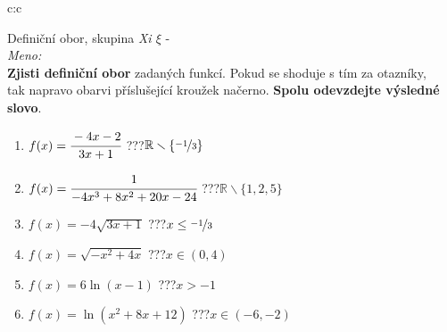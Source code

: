 \documentclass[10pt]{report}
\begin{document}
\newpage
\thispagestyle{empty}
\begin{tabular}{c:c}
\begin{minipage}[c][99mm][t]{0.49\linewidth}
\begin{center}
\vspace{7mm}
{\huge Definiční obor, skupina \textit{Xi $\xi$} -}\\[4.5mm]
\textit{Meno:}\phantom{xxxxxxxxxxxxxxxxxxxxxxxxxxxxxxxxxxxxxxxxxxxxxxxxxxxxxxxxxxxxxxxxx}\\[3.5mm]
\textbf{Zjisti definiční obor} zadaných funkcí. Pokud se shoduje s tím za otazníky,\\tak napravo obarvi příslušející kroužek načerno. \textbf{Spolu odevzdejte výsledné slovo}.\\[3mm]
\begin{minipage}{0.77\linewidth}
\begin{center}
\begin{varwidth}{\textwidth}
\begin{enumerate}
\normalsize
\item $f(x)=\cfrac{-4x-2}{3x+1}$\quad \dotfill\; ???\;\dotfill \quad $\mathbb{R}\smallsetminus\{\nicefrac{-1}{3}\}$
\item $f(x)=\cfrac{1}{-4x^3+8x^2+20x-24}$\quad \dotfill\; ???\;\dotfill \quad $\mathbb{R}\smallsetminus\{1,2,5\}$
\item $f(x)=-4\sqrt{3x+1}$\quad \dotfill\; ???\;\dotfill \quad $x\leq\nicefrac{-1}{3}$
\item $f(x)=\sqrt{-x^2+4x}$\quad \dotfill\; ???\;\dotfill \quad $x\in(0 , 4)$
\item $f(x)=6\ln{(x-1)}$\quad \dotfill\; ???\;\dotfill \quad $x>-1$
\item $f(x)=\ln{(x^2+8x+12)}$\quad \dotfill\; ???\;\dotfill \quad $x\in(-6 , -2)$
\end{enumerate}
\end{varwidth}
\end{center}
\end{minipage}
\begin{minipage}{0.20\linewidth}

\end{minipage}
\end{center}
\end{minipage}
\end{tabular}
\end{document}
